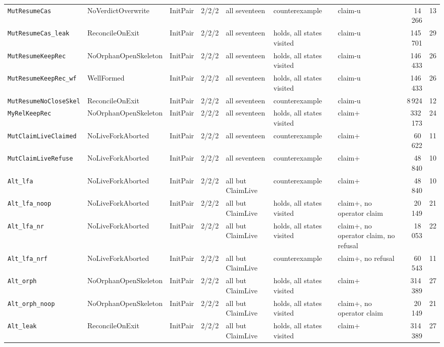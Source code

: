 \documentclass[a4paper,10pt,fleqn]{article}
\begin{document}
{\begin{center}
\begin{tabularx}{\textwidth}{@{}l l l l X X l r r@{}}
\texttt{MutResumeCas} & NoVerdictOverwrite & InitPair & 2/2/2 & all seventeen & counterexample & claim-u & 14\,266 & 13 \\
\texttt{MutResumeCas\_leak} & ReconcileOnExit & InitPair & 2/2/2 & all seventeen & holds, all states visited & claim-u & 145\,701 & 29 \\
\texttt{MutResumeKeepRec} & NoOrphanOpenSkeleton & InitPair & 2/2/2 & all seventeen & holds, all states visited & claim-u & 146\,433 & 26 \\
\texttt{MutResumeKeepRec\_wf} & WellFormed & InitPair & 2/2/2 & all seventeen & holds, all states visited & claim-u & 146\,433 & 26 \\
\texttt{MutResumeNoCloseSkel} & ReconcileOnExit & InitPair & 2/2/2 & all seventeen & counterexample & claim-u & 8\,924 & 12 \\
\texttt{MyRelKeepRec} & NoOrphanOpenSkeleton & InitPair & 2/2/2 & all seventeen & holds, all states visited & claim+ & 332\,173 & 24 \\
\texttt{MutClaimLiveClaimed} & NoLiveForkAborted & InitPair & 2/2/2 & all seventeen & counterexample & claim+ & 60\,622 & 11 \\
\texttt{MutClaimLiveRefuse} & NoLiveForkAborted & InitPair & 2/2/2 & all seventeen & counterexample & claim+ & 48\,840 & 10 \\
\texttt{Alt\_lfa} & NoLiveForkAborted & InitPair & 2/2/2 & all but ClaimLive & counterexample & claim+ & 48\,840 & 10 \\
\texttt{Alt\_lfa\_noop} & NoLiveForkAborted & InitPair & 2/2/2 & all but ClaimLive & holds, all states visited & claim+, no operator claim & 20\,149 & 21 \\
\texttt{Alt\_lfa\_nr} & NoLiveForkAborted & InitPair & 2/2/2 & all but ClaimLive & holds, all states visited & claim+, no operator claim, no refusal & 18\,053 & 22 \\
\texttt{Alt\_lfa\_nrf} & NoLiveForkAborted & InitPair & 2/2/2 & all but ClaimLive & counterexample & claim+, no refusal & 60\,543 & 11 \\
\texttt{Alt\_orph} & NoOrphanOpenSkeleton & InitPair & 2/2/2 & all but ClaimLive & holds, all states visited & claim+ & 314\,389 & 27 \\
\texttt{Alt\_orph\_noop} & NoOrphanOpenSkeleton & InitPair & 2/2/2 & all but ClaimLive & holds, all states visited & claim+, no operator claim & 20\,149 & 21 \\
\texttt{Alt\_leak} & ReconcileOnExit & InitPair & 2/2/2 & all but ClaimLive & holds, all states visited & claim+ & 314\,389 & 27 \\

\end{tabularx}
\end{center}}
\end{document}
